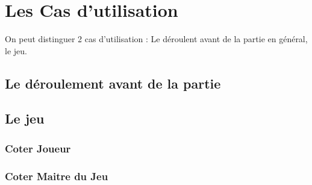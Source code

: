 \chapter{Les Cas d'utilisation}

On peut distinguer 2 cas d'utilisation : Le déroulent avant de la partie en général, le jeu.

\section{Le déroulement avant de la partie}

\section{Le jeu}

\subsection{Coter Joueur}

\subsection{Coter Maitre du Jeu}


